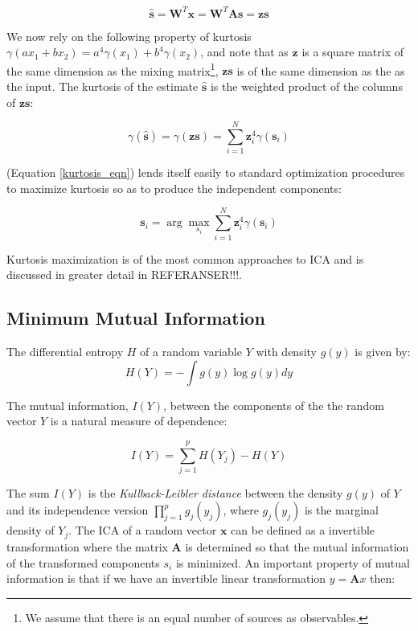 \documentclass[11pt, oneside, a4paper]{report}
\begin{document}
\begin{equation}
  \hat{\boldsymbol{s}} = \boldsymbol{W}^T\boldsymbol{x} = \boldsymbol{W}^T\boldsymbol{A}\boldsymbol{s}
  =\boldsymbol{z}\boldsymbol{s}
\end{equation}

We now rely on the following property of kurtosis 
$\gamma(ax_1+bx_2) = a^4\gamma(x_1) + b^4\gamma(x_2)$, and note that as 
$\boldsymbol{z}$ is a square matrix of the same dimension as the mixing 
matrix\footnote{We assume that there is an equal number of sources as observables.},
$\boldsymbol{z}\boldsymbol{s}$ is of the same dimension as the as the input. 
The kurtosis of the estimate $\hat{\boldsymbol{s}}$ is the weighted product
of the columns of $\boldsymbol{z}\boldsymbol{s}$:


\begin{equation}
  \label{kurtosis_eqn}
  \gamma(\hat{\boldsymbol{s}}) = \gamma(\boldsymbol{z}\boldsymbol{s})
  = \sum_{i=1}^N \boldsymbol{z}_i^4\gamma(\boldsymbol{s}_i)
\end{equation}

(Equation \ref{kurtosis_eqn}) lends itself easily to standard optimization
procedures to maximize kurtosis so as to produce the independent components:

\begin{equation}
  \boldsymbol{s}_i = \arg \max_{s_i} \sum_{i=1}^N \boldsymbol{z}_i^4\gamma(\boldsymbol{s}_i)  
\end{equation}

Kurtosis maximization is of the most common approaches to ICA and is discussed
in greater detail in REFERANSER!!!.


\subsection{Minimum Mutual Information}

The differential entropy $H$ of a random variable $Y$ with density $g(y)$ is given by:
\begin{equation}
  H(Y) = - \int g(y) \log g(y) dy
\end{equation}

The mutual information, $I(Y)$, between the components of the the random vector $Y$ is a natural measure of dependence:

\begin{equation}
  I(Y) = \sum_{j=1}^{p} H(Y_{j}) - H(Y)
\end{equation}

The sum $I(Y)$ is the \emph{Kullback-Leibler distance} between the density $g(y)$ of $Y$ and its independence 
version $\prod_{j=1}^{p} g_{j}(y_{j})$, where $g_{j}(y_{j})$ is the marginal density of $Y_{j}$. The ICA of a random 
vector $\mathbf x$ can be defined as a invertible transformation where the matrix $\mathbf A$ is determined 
so that the mutual information of the transformed components $s_i$ is minimized.
An important property of mutual information is that if we have an invertible linear transformation 
$y = \mathbf Ax$ then:
\end{document}
